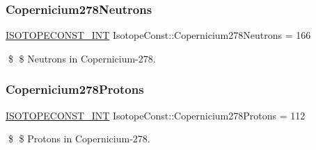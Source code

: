 \subsubsection{\texorpdfstring{Copernicium278\+Neutrons}{Copernicium278Neutrons}}
{\footnotesize\ttfamily \mbox{\hyperlink{group___isotope_const-_macros_ga5f18360b3e99483a35c32d789e62621c}{I\+S\+O\+T\+O\+P\+E\+C\+O\+N\+S\+T\+\_\+\+I\+NT}} Isotope\+Const\+::\+Copernicium278\+Neutrons = 166}

\$ \$ Neutrons in Copernicium-\/278. \mbox{\label{group___isotope_const-_copernicium-_cn278_gacd31c10965a0630d53f470d17ceb6779}} 
\subsubsection{\texorpdfstring{Copernicium278\+Protons}{Copernicium278Protons}}
{\footnotesize\ttfamily \mbox{\hyperlink{group___isotope_const-_macros_ga5f18360b3e99483a35c32d789e62621c}{I\+S\+O\+T\+O\+P\+E\+C\+O\+N\+S\+T\+\_\+\+I\+NT}} Isotope\+Const\+::\+Copernicium278\+Protons = 112}

\$ \$ Protons in Copernicium-\/278. 